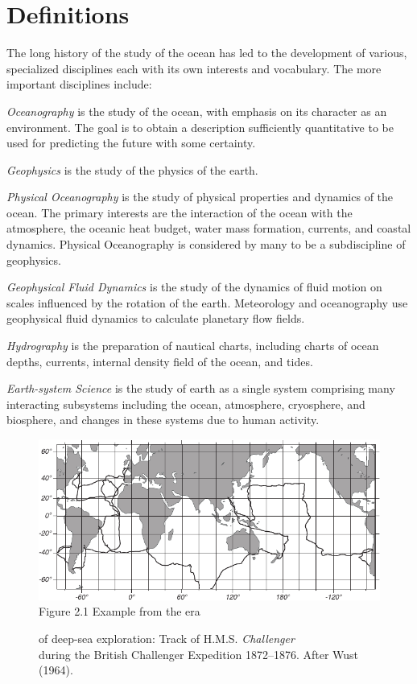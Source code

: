 \section{Definitions}
The long history of the study of the ocean has led to the development
of various, specialized disciplines each with its own interests and
vocabulary. The more important disciplines include:

\textit{Oceanography} is the study of the
ocean, with emphasis on its character as an environment. The goal is
to obtain a description sufficiently quantitative to be used for
predicting the future with some certainty.

\textit{Geophysics} is the study of the
physics of the earth.

\textit{Physical Oceanography} is the
study of physical properties and dynamics of
the ocean. The primary interests are the interaction of the ocean with
the atmosphere, the oceanic heat budget, water mass formation,
currents, and coastal dynamics. Physical Oceanography is considered by
many to be a subdiscipline of geophysics.

\textit{Geophysical Fluid Dynamics} is
the study of the dynamics of
fluid motion on scales influenced by the rotation of the
earth. Meteorology and oceanography use geophysical fluid dynamics to
calculate planetary flow fields.

\textit{Hydrography} is the preparation of
nautical charts, including charts of ocean depths, currents, internal
density field of the ocean, and tides.

\textit{Earth-system Science} is
the study of earth as a single
system comprising many interacting subsystems including the ocean,
atmosphere, cryosphere, and biosphere, and changes in these systems
due to human activity.

\begin{figure}[t!]
\includegraphics{pics/Fig2-1}
\centering
\footnotesize
Figure 2.1 Example from the era\rule{0pt}{3ex} of deep-sea
exploration: Track of H.M.S. \textit{Challenger}\\ during the British
Challenger Expedition 1872--1876. After Wust (1964).

\label{fig:Fig2-1}
\vspace{-3ex}
\end{figure}


